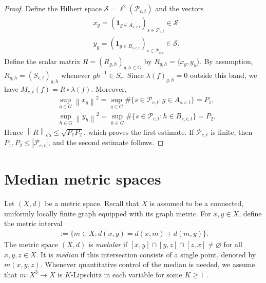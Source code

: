 \documentclass[12pt,reqno]{amsart}
\newcommand{\norm}[1]{\left\|#1\right\|}
\numberwithin{equation}{section}
\begin{document}
\begin{proof}
    Define the Hilbert space $\mathcal{S}=\ell^2(\mathcal{P}_{c,t})$ and the vectors
    \begin{align*}
        &x_g=\left(\mathbf{1}_{g\in A_{s,c,t}}\right)_{s\in \mathcal{P}_{c,t}}\in \mathcal{S}\\
        &y_g=\left(\mathbf{1}_{g\in B_{s,c,t}}\right)_{s\in \mathcal{P}_{c,t}}\in \mathcal{S}.
    \end{align*}
    Define the scalar matrix $R=(R_{g,h})_{g,h\in G}$ by $R_{g,h}=\langle x_g,y_h\rangle$. By assumption, $R_{g,h}=(S_{c,t})_{g,h}$ whenever $gh^{-1}\in S_r$. Since $\lambda(f)_{g,h}=0$ outside this band, we have $M_{c,t}(f)=R\circ\lambda(f)$. Moreover,
    \begin{align*}
        &\sup_{g\in G}\norm{x_g}^2=\sup_{g\in G}\#\{s\in \mathcal{P}_{c,t}: g\in A_{s,c,t}\}=P_1,\\
        &\sup_{h\in G}\norm{y_h}^2=\sup_{h\in G}\#\{s\in \mathcal{P}_{c,t}: h\in B_{s,c,t}\}=P_2.
    \end{align*}
    Hence $\norm{R}_{\operatorname{cb}}\le\sqrt{P_1P_2}$, which proves the first estimate. If $\mathcal{P}_{c,t}$ is finite, then $P_1,P_2\le|\mathcal{P}_{c,t}|$, and the second estimate follows.
\end{proof}






\section{Median metric spaces}\label{section: median spaces}
Let $(X,d)$ be a metric space. Recall that $X$ is assumed to be a connected, uniformly locally finite graph equipped with its graph metric. For $x,y\in X$, define the metric interval
\begin{align*}
    [x,y]:=\{m\in X: d(x,y)=d(x,m)+d(m,y)\}.
\end{align*}
The metric space $(X,d)$ is \textit{modular} if $[x,y]\cap[y,z]\cap[z,x]\ne\varnothing$ for all $x,y,z\in X$. It is \textit{median} if this intersection consists of a single point, denoted by $m(x,y,z)$. Whenever quantitative control of the median is needed, we assume that $m:X^3\to X$ is $K$-Lipschitz in each variable for some $K\ge1$ \cite[Assumption (L2)]{SpakulaWright2017propertyA}.
\end{document}
